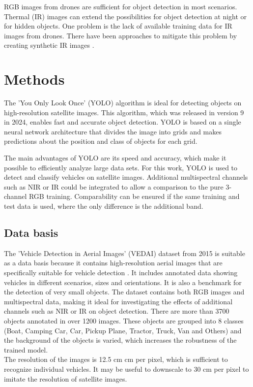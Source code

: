 \documentclass[a4paper,11pt,pdftex, parskip]{scrreprt}
\begin{document}
RGB images from drones are sufficient for object detection in most scenarios. Thermal (IR) images can extend the possibilities for object detection at night or for hidden objects. One problem is the lack of available training data for IR images from drones. There have been approaches to mitigate this problem by creating synthetic IR images \cite{Yang2022}. \\



\section*{Methods}
The 'You Only Look Once' (YOLO) algorithm is ideal for detecting objects on high-resolution satellite images. This algorithm, which was released in version 9 in 2024, enables fast and accurate object detection. YOLO is based on a single neural network architecture that divides the image into grids and makes predictions about the position and class of objects for each grid. 

The main advantages of YOLO are its speed and accuracy, which make it possible to efficiently analyze large data sets. For this work, YOLO is used to detect and classify vehicles on satellite images. Additional multispectral channels such as NIR or IR could be integrated to allow a comparison to the pure 3-channel RGB training. Comparability can be ensured if the same training and test data is used, where the only difference is the additional band.

\subsection*{Data basis}

The 'Vehicle Detection in Aerial Images' (VEDAI) dataset \cite{vedai_web} from 2015 is suitable as a data basis because it contains high-resolution aerial images that are specifically suitable for vehicle detection \cite{Razakarivony2015}. It includes annotated data showing vehicles in different scenarios, sizes and orientations. It is also a benchmark for the detection of very small objects. The dataset contains both RGB images and multispectral data, making it ideal for investigating the effects of additional channels such as NIR or IR on object detection. There are more than 3700 objects annotated in over 1200 images. These objects are grouped into 8 classes (Boat, Camping Car, Car, Pickup Plane, Tractor, Truck, Van and Others) and the background of the objects is varied, which increases the robustness of the trained model. \\
The resolution of the images is 12.5 cm  cm per pixel, which is sufficient to recognize individual vehicles. It may be useful to downscale to 30 cm per pixel to imitate the resolution of satellite images.
 
\end{document}
